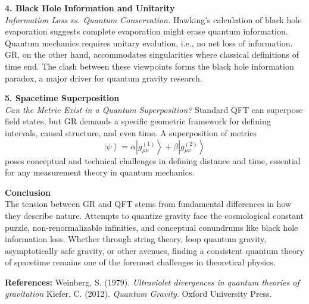 \begin{technical}
    \noindent\textbf{4. Black Hole Information and Unitarity}\\[0.5em]
    \textit{Information Loss vs. Quantum Conservation.}
    Hawking’s calculation of black hole evaporation suggests complete evaporation might erase quantum information. Quantum mechanics requires unitary evolution, i.e., no net loss of information. GR, on the other hand, accommodates singularities where classical definitions of time end. The clash between these viewpoints forms the black hole information paradox, a major driver for quantum gravity research.

    \noindent\textbf{5. Spacetime Superposition}\\[0.5em]
    \textit{Can the Metric Exist in a Quantum Superposition?}
    Standard QFT can superpose field states, but GR demands a specific geometric framework for defining intervals, causal structure, and even time. A superposition of metrics
    \[
        \left|\psi\right> = \alpha \left|g_{\mu\nu}^{(1)}\right> + \beta \left|g_{\mu\nu}^{(2)}\right>
    \]
    poses conceptual and technical challenges in defining distance and time, essential for any measurement theory in quantum mechanics.

    \noindent\textbf{Conclusion}\\[0.5em]
    The tension between GR and QFT stems from fundamental differences in how they describe nature. Attempts to quantize gravity face the cosmological constant puzzle, non-renormalizable infinities, and conceptual conundrums like black hole information loss. Whether through string theory, loop quantum gravity, asymptotically safe gravity, or other avenues, finding a consistent quantum theory of spacetime remains one of the foremost challenges in theoretical physics.

    \vspace{0.5em}
    \noindent\textbf{References:}
    Weinberg, S. (1979). \textit{Ultraviolet divergences in quantum theories of gravitation}
    Kiefer, C. (2012). \textit{Quantum Gravity}. Oxford University Press.

\end{technical}
